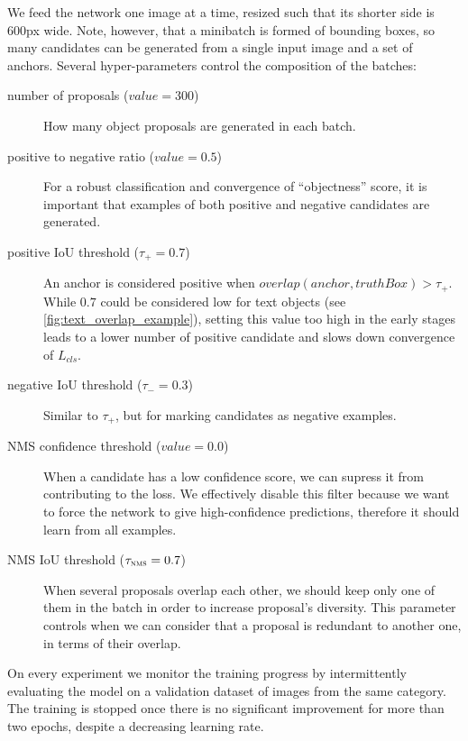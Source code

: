 		We feed the network one image at a time, resized such that its shorter side is 600px wide. Note, however, that a minibatch is formed of bounding boxes, so many candidates can be generated from a single input image and a set of anchors. Several hyper-parameters control the composition of the batches:
		\begin{description}
			\item[number of proposals (\(\mathit{value} = 300\))] How many object proposals are generated in each batch.

			\item[positive to negative ratio (\(\mathit{value} = 0.5\))] For a robust classification and convergence of ``objectness'' score, it is important that examples of both positive and negative candidates are generated.

			\item[positive IoU threshold (\(\tau_{+} = 0.7\))] An anchor is considered positive when \(\mathit{overlap}(\mathit{anchor}, \mathit{truthBox}) > \tau_+\). While \(0.7\) could be considered low for text objects (see \autoref{fig:text_overlap_example}), setting this value too high in the early stages leads to a lower number of positive candidate and slows down convergence of \(L_{cls}\).

			\item[negative IoU threshold (\(\tau_{-} = 0.3\))] Similar to \(\tau_{+}\), but for marking candidates as negative examples.

			\item[NMS confidence threshold (\(\mathit{value} = 0.0\))] When a candidate has a low confidence score, we can supress it from contributing to the loss. We effectively disable this filter because we want to force the network to give high-confidence predictions, therefore it should learn from all examples.

			\item[NMS IoU threshold (\(\tau_{\textsc{nms}} = 0.7\))] When several proposals overlap each other, we should keep only one of them in the batch in order to increase proposal's diversity. This parameter controls when we can consider that a proposal is redundant to another one, in terms of their overlap.

		\end{description}

		On every experiment we monitor the training progress by intermittently evaluating the model on a validation dataset of images from the same category. The training is stopped once there is no significant improvement for more than two epochs, despite a decreasing learning rate.



